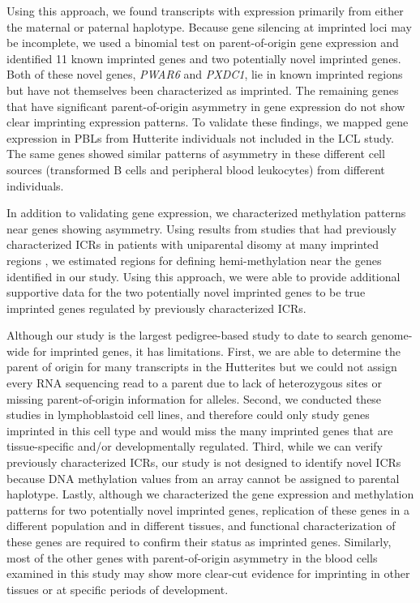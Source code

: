 Using this approach, we found transcripts with expression primarily from either the maternal or paternal haplotype. Because gene silencing at imprinted loci may be incomplete, we used a binomial test on parent-of-origin gene expression and identified 11 known imprinted genes and two potentially novel imprinted genes. Both of these novel genes, \emph{PWAR6} and \emph{PXDC1}, lie in known imprinted regions but have not themselves been characterized as imprinted. The remaining genes that have significant parent-of-origin asymmetry in gene expression do not show clear imprinting expression patterns. To validate these findings, we mapped gene expression in PBLs from Hutterite individuals not included in the LCL study. The same genes showed similar patterns of asymmetry in these different cell sources (transformed B cells and peripheral blood leukocytes) from different individuals.

In addition to validating gene expression, we characterized methylation patterns near genes showing asymmetry. Using results from studies that had previously characterized ICRs in patients with uniparental disomy at many imprinted regions \citep{Joshi:2016bb, Court:2014kc}, we estimated regions for defining hemi-methylation near the genes identified in our study. Using this approach, we were able to provide additional supportive data for the two potentially novel imprinted genes to be true imprinted genes regulated by previously characterized ICRs. 

Although our study is the largest pedigree-based study to date to search genome-wide for imprinted genes, it has limitations. First, we are able to determine the parent of origin for many transcripts in the Hutterites but we could not assign every RNA sequencing read to a parent due to lack of heterozygous sites or missing parent-of-origin information for alleles. Second, we conducted these studies in lymphoblastoid cell lines, and therefore could only study genes imprinted in this cell type and would miss the many imprinted genes that are tissue-specific and/or developmentally regulated. Third, while we can verify previously characterized ICRs, our study is not designed to identify novel ICRs because DNA methylation values from an array cannot be assigned to parental haplotype. Lastly, although we characterized the gene expression and methylation patterns for two potentially novel imprinted genes, replication of these genes in a different population and in different tissues, and functional characterization of these genes are required to confirm their status as imprinted genes. Similarly, most of the other genes with parent-of-origin asymmetry in the blood cells examined in this study may show more clear-cut evidence for imprinting in other tissues or at specific periods of development.  

